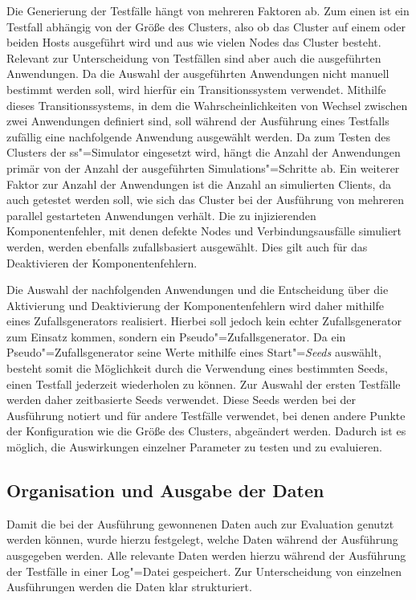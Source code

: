 Die Generierung der Testfälle hängt von mehreren Faktoren ab.
Zum einen ist ein Testfall abhängig von der Größe des Clusters, also ob das Cluster auf einem oder beiden Hosts ausgeführt wird und aus wie vielen Nodes das Cluster besteht.
Relevant zur Unterscheidung von Testfällen sind aber auch die ausgeführten Anwendungen.
Da die Auswahl der ausgeführten Anwendungen nicht manuell bestimmt werden soll, wird hierfür ein Transitionssystem verwendet.
Mithilfe dieses Transitionssystems, in dem die Wahrscheinlichkeiten von Wechsel zwischen zwei Anwendungen definiert sind, soll während der Ausführung eines Testfalls zufällig eine nachfolgende Anwendung ausgewählt werden.
Da zum Testen des Clusters der \ac{ss}"=Simulator eingesetzt wird, hängt die Anzahl der Anwendungen primär von der Anzahl der ausgeführten Simulations"=Schritte ab.
Ein weiterer Faktor zur Anzahl der Anwendungen ist die Anzahl an simulierten Clients, da auch getestet werden soll, wie sich das Cluster bei der Ausführung von mehreren parallel gestarteten Anwendungen verhält.
Die zu injizierenden Komponentenfehler, mit denen defekte Nodes und Verbindungsausfälle simuliert werden, werden ebenfalls zufallsbasiert ausgewählt.
Dies gilt auch für das Deaktivieren der Komponentenfehlern.

Die Auswahl der nachfolgenden Anwendungen und die Entscheidung über die Aktivierung und Deaktivierung der Komponentenfehlern wird daher mithilfe eines Zufallsgenerators realisiert.
Hierbei soll jedoch kein echter Zufallsgenerator zum Einsatz kommen, sondern ein Pseudo"=Zufallsgenerator.
Da ein Pseudo"=Zufallsgenerator seine Werte mithilfe eines Start"=\emph{Seeds} auswählt, besteht somit die Möglichkeit durch die Verwendung eines bestimmten Seeds, einen Testfall jederzeit wiederholen zu können.
Zur Auswahl der ersten Testfälle werden daher zeitbasierte Seeds verwendet.
Diese Seeds werden bei der Ausführung notiert und für andere Testfälle verwendet, bei denen andere Punkte der Konfiguration wie \zB die Größe des Clusters, abgeändert werden.
Dadurch ist es möglich, die Auswirkungen einzelner Parameter zu testen und zu evaluieren.

\subsection{Organisation und Ausgabe der Daten}
\label{sec:dataOrganisation}

Damit die bei der Ausführung gewonnenen Daten auch zur Evaluation genutzt werden können, wurde hierzu festgelegt, welche Daten während der Ausführung ausgegeben werden.
Alle relevante Daten werden hierzu während der Ausführung der Testfälle in einer Log"=Datei gespeichert.
Zur Unterscheidung von einzelnen Ausführungen werden die Daten klar strukturiert.

